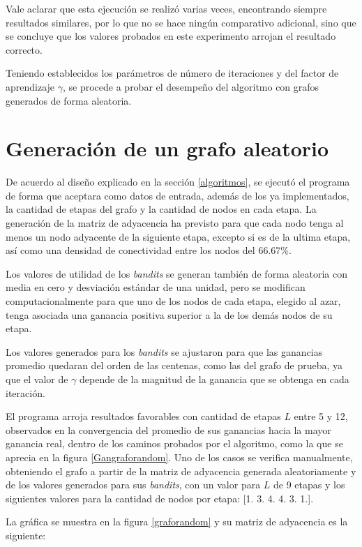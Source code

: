 Vale aclarar que esta ejecución se realizó varias veces, encontrando siempre resultados similares, por lo que no se hace ningún comparativo adicional, sino que  se concluye que los valores probados en este experimento arrojan el resultado correcto.

Teniendo establecidos los parámetros de número de iteraciones y del factor de aprendizaje $\gamma$, se procede a probar el desempeño del algoritmo con grafos generados de forma aleatoria.

\section{Generación de un grafo aleatorio}

De acuerdo al diseño explicado en la sección \ref{algoritmos}, se ejecutó el programa de forma que aceptara como datos de entrada, además de los ya implementados, la cantidad de etapas del grafo y la cantidad de nodos en cada etapa. La generación de la matriz de adyacencia ha previsto para que cada nodo tenga al menos un nodo adyacente de la siguiente etapa, excepto si es de la ultima etapa, así como una densidad de conectividad entre los nodos del 66.67\%. 

Los valores de utilidad de los \textit{bandits} se generan también de forma aleatoria con media en cero y desviación estándar de una unidad, pero se modifican computacionalmente para que uno de los nodos de cada etapa, elegido al azar, tenga asociada una ganancia positiva superior a la de los demás nodos de su etapa. 

Los valores generados para los \textit{bandits} se ajustaron para que las ganancias promedio quedaran del orden de las centenas, como las del grafo de prueba, ya que el valor de $\gamma$ depende de la magnitud de la ganancia que se obtenga en cada iteración.

El programa arroja resultados favorables con cantidad de etapas $L$ entre 5 y 12, observados en la convergencia del promedio de sus ganancias hacia la mayor ganancia real, dentro de los caminos probados por el algoritmo, como la que se aprecia en la figura \ref{Gangraforandom}. Uno de los casos se verifica manualmente, obteniendo el grafo a partir de la matriz de adyacencia generada aleatoriamente y de los valores generados para sus \textit{bandits}, con un valor para $L$ de 9 etapas y los siguientes valores para la cantidad de nodos por etapa: [1. 3. 4. 4. 3. 1.].

La gráfica se muestra en la figura \ref{graforandom} y su matriz de adyacencia es la siguiente:

